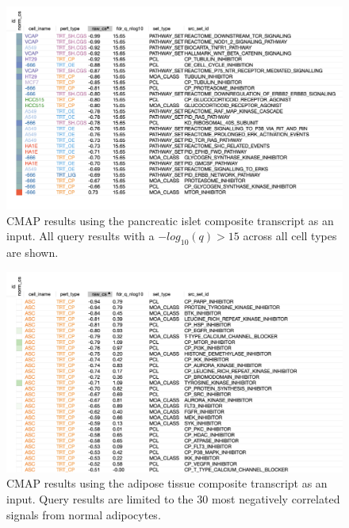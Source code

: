 \documentclass[
]{article}
\begin{document}
\begin{figure}[ht!]
\includegraphics[width=\textwidth]{Figures/Supp_Fig_Islet_all_cell_types.png} 
\caption{CMAP results using the pancreatic islet composite transcript as 
an input. All query results with a $-log_{10}(q) > 15$ across all cell types 
are shown.
}
\label{fig:clue_islet_all}
\end{figure}

\begin{figure}[ht!]
\includegraphics[width=\textwidth]{Figures/Supp_Fig_Adipose_ASC.png} 
\caption{CMAP results using the adipose tissue composite transcript as 
an input. Query results are limited to the 30 most negatively correlated 
signals from normal adipocytes.
}
\label{fig:clue_adipose_asc}
\end{figure}
\end{document}
